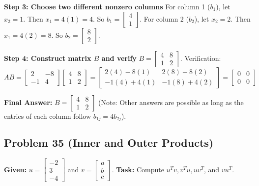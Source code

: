 \documentclass{article}
\begin{document}
\textbf{Step 3: Choose two different nonzero columns}
For column 1 ($b_1$), let $x_2 = 1$. Then $x_1 = 4(1) = 4$. So $b_1 = \begin{bmatrix} 4 \\ 1 \end{bmatrix}$.
For column 2 ($b_2$), let $x_2 = 2$. Then $x_1 = 4(2) = 8$. So $b_2 = \begin{bmatrix} 8 \\ 2 \end{bmatrix}$.

\textbf{Step 4: Construct matrix $B$ and verify}
$B = \begin{bmatrix} 4 & 8 \\ 1 & 2 \end{bmatrix}$.
Verification:
\[ AB = \begin{bmatrix} 2 & -8 \\ -1 & 4 \end{bmatrix} \begin{bmatrix} 4 & 8 \\ 1 & 2 \end{bmatrix} = \begin{bmatrix} 2(4)-8(1) & 2(8)-8(2) \\ -1(4)+4(1) & -1(8)+4(2) \end{bmatrix} = \begin{bmatrix} 0 & 0 \\ 0 & 0 \end{bmatrix} \]

\textbf{Final Answer:} $B = \begin{bmatrix} 4 & 8 \\ 1 & 2 \end{bmatrix}$ (Note: Other answers are possible as long as the entries of each column follow $b_{1j} = 4b_{2j}$).

\vspace{1em}
\subsection*{Problem 35 (Inner and Outer Products)}
\textbf{Given:} $u = \begin{bmatrix} -2 \\ 3 \\ -4 \end{bmatrix}$ and $v = \begin{bmatrix} a \\ b \\ c \end{bmatrix}$.
\textbf{Task:} Compute $u^T v, v^T u, uv^T$, and $vu^T$.
\end{document}
